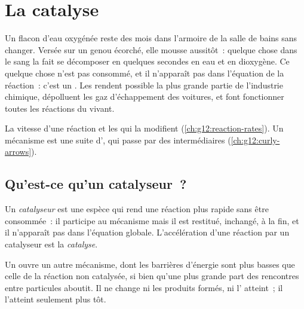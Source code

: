 \chapter{La catalyse}\label{ch:g12:catalysis}

Un flacon d'eau oxygénée reste des mois dans l'armoire de la salle de
bains sans changer. Versée sur un genou écorché, elle mousse aussitôt~:
quelque chose dans le sang la fait se décomposer en quelques secondes en
eau et en dioxygène. Ce quelque chose n'est pas consommé, et il
n'apparaît pas dans l'équation de la réaction~: c'est un . Les
 rendent possible la plus grande partie de l'industrie
chimique, dépolluent les gaz d'échappement des voitures, et font
fonctionner toutes les réactions du vivant.

\begin{recall}
La vitesse d'une réaction et les  qui la modifient
(\cref{ch:g12:reaction-rates}). Un mécanisme est une suite d', qui passe par des intermédiaires (\cref{ch:g12:curly-arrows}).
\end{recall}

\section{Qu'est-ce qu'un catalyseur~?}

\begin{definition}\label{def:g12:catalysis:catalyst}
Un \emph{catalyseur} est une espèce qui rend une
réaction plus rapide sans être consommée~: il participe au mécanisme
mais il est restitué, inchangé, à la fin, et il n'apparaît pas dans
l'équation globale. L'accélération d'une réaction par un catalyseur est
la \emph{catalyse}.
\end{definition}

\begin{proposition}\label{prop:g12:catalysis:path}
Un  ouvre un autre mécanisme, dont les barrières d'énergie
sont plus basses que celle de la réaction non catalysée, si bien qu'une
plus grande part des rencontres entre particules aboutit. Il ne change
ni les produits formés, ni l' atteint~; il l'atteint seulement
plus tôt.
\end{proposition}

